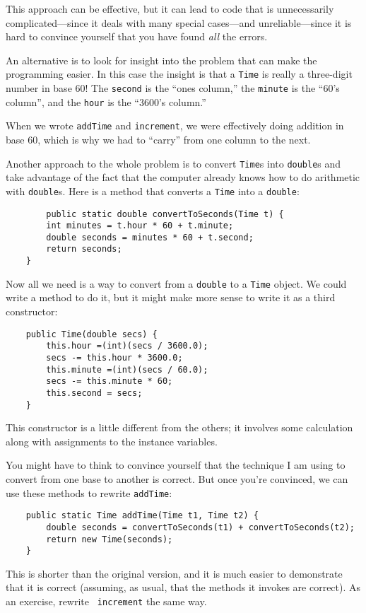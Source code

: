 \documentclass[12pt]{book}
\theoremstyle{definition}
\begin{document}
This approach can be effective, but it can lead to code
that is unnecessarily complicated---since it deals with many
special cases---and unreliable---since it is hard to convince
yourself that you have found {\em all} the errors.

An alternative is to look for insight
into the problem that can make the programming easier.  In
this case the insight is that a {\tt Time} is really a three-digit
number in base 60!  The {\tt second} is the ``ones column,''
the {\tt minute} is the ``60's column'', and the {\tt hour}
is the ``3600's column.''

When we wrote {\tt addTime} and {\tt increment}, we were effectively
doing addition in base 60, which is why we had to ``carry'' from one
column to the next.


Another approach to the whole problem is to convert
{\tt Time}s into {\tt double}s and take advantage of the fact that
the computer already knows how to do arithmetic with {\tt double}s.
Here is a method that converts a {\tt Time} into a {\tt double}:

\begin{lstlisting}
        public static double convertToSeconds(Time t) {
        int minutes = t.hour * 60 + t.minute;
        double seconds = minutes * 60 + t.second;
        return seconds;
    }
\end{lstlisting}
%
Now all we need is a way to convert from a {\tt double}
to a {\tt Time} object.  We could write a method to
do it, but it might make more sense to write it as a third
constructor:

\begin{lstlisting}
    public Time(double secs) {
        this.hour =(int)(secs / 3600.0);
        secs -= this.hour * 3600.0;
        this.minute =(int)(secs / 60.0);
        secs -= this.minute * 60;
        this.second = secs;
    }
\end{lstlisting}
%
This constructor is a little different from the others;
it involves some calculation along with assignments to the
instance variables.

You might have to think to convince yourself that the technique
I am using to convert from one base to another is correct.  But once
you're convinced, we can use these methods to rewrite {\tt addTime}:

\begin{lstlisting}
    public static Time addTime(Time t1, Time t2) {
        double seconds = convertToSeconds(t1) + convertToSeconds(t2);
        return new Time(seconds);
    }
\end{lstlisting}
%
This is shorter than the original version, and it is much easier
to demonstrate that it is correct (assuming, as usual, that the
methods it invokes are correct).  As an exercise, rewrite {\tt
increment} the same way.
\end{document}
